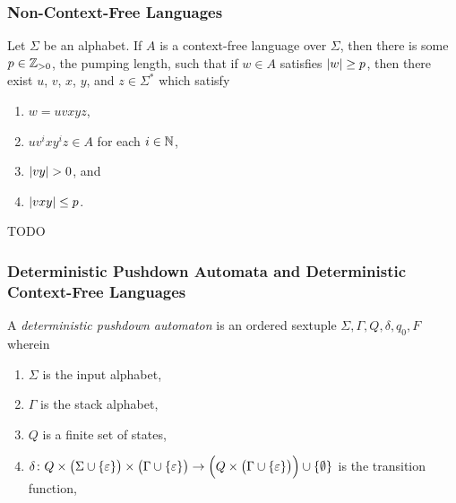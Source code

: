 \subsubsection{Non-Context-Free Languages}

  Let \(\Sigma\) be an alphabet. If \(A\) is a context-free language over \(\Sigma\), then there is some
  \(p \in \mathbb{Z}_{>0}\), the pumping length, such that if \(w \in A\) satisfies \(\lvert w\rvert \geq p\), then there exist \(u\),
  \(v\), \(x\), \(y\), and \(z \in \Sigma^*\) which satisfy
  \begin{enumerate}
    \item \(w = u v x y z\),
    \item \(u v^i x y^i z \in A\) for each \(i \in \mathbb{N}\),
    \item \(\lvert v y\rvert > 0\), and
    \item \(\lvert v x y\rvert \leq p\).
  \end{enumerate}
\Eth
\Bpr
  TODO
\Epr

\subsubsection{Deterministic Pushdown Automata and Deterministic Context-Free Languages}

\Bdf
  A \emph{deterministic pushdown automaton} is an ordered sextuple \(\Sigma, \Gamma, Q, \delta, q_0, F\) wherein
  \begin{enumerate}
    \item \(\Sigma\) is the input alphabet,
    \item \(\Gamma\) is the stack alphabet,
    \item \(Q\) is a finite set of states,
    \item \(\delta\colon Q \times \big(\Sigma \cup \{\varepsilon\}\big) \times \big(\Gamma
    \cup \{\varepsilon\}\big)\to\Big(Q \times \big(\Gamma \cup \{\varepsilon\}\big)\Big) \cup \{\emptyset\}\) is the
    transition function,
  \end{enumerate}
\Edf

\Edc
